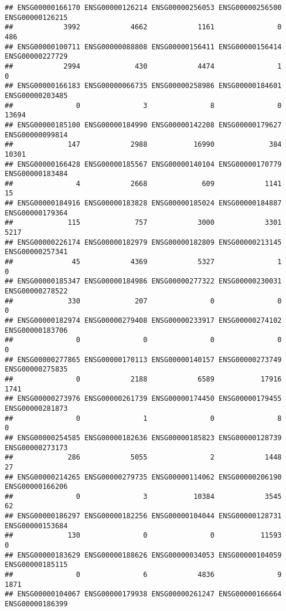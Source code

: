 \documentclass[
]{article}
\begin{document}
\begin{verbatim}
## ENSG00000166170 ENSG00000126214 ENSG00000256053 ENSG00000256500 ENSG00000126215 
##            3992            4662            1161               0             486 
## ENSG00000100711 ENSG00000088808 ENSG00000156411 ENSG00000156414 ENSG00000227729 
##            2994             430            4474               1               0 
## ENSG00000166183 ENSG00000066735 ENSG00000258986 ENSG00000184601 ENSG00000203485 
##               0               3               8               0           13694 
## ENSG00000185100 ENSG00000184990 ENSG00000142208 ENSG00000179627 ENSG00000099814 
##             147            2988           16990             384           10301 
## ENSG00000166428 ENSG00000185567 ENSG00000140104 ENSG00000170779 ENSG00000183484 
##               4            2668             609            1141              15 
## ENSG00000184916 ENSG00000183828 ENSG00000185024 ENSG00000184887 ENSG00000179364 
##             115             757            3000            3301            5217 
## ENSG00000226174 ENSG00000182979 ENSG00000182809 ENSG00000213145 ENSG00000257341 
##              45            4369            5327               1               0 
## ENSG00000185347 ENSG00000184986 ENSG00000277322 ENSG00000230031 ENSG00000278522 
##             330             207               0               0               0 
## ENSG00000182974 ENSG00000279408 ENSG00000233917 ENSG00000274102 ENSG00000183706 
##               0               0               0               0               0 
## ENSG00000277865 ENSG00000170113 ENSG00000140157 ENSG00000273749 ENSG00000275835 
##               0            2188            6589           17916            1741 
## ENSG00000273976 ENSG00000261739 ENSG00000174450 ENSG00000179455 ENSG00000281873 
##               0               1               0               8               0 
## ENSG00000254585 ENSG00000182636 ENSG00000185823 ENSG00000128739 ENSG00000273173 
##             286            5055               2            1448              27 
## ENSG00000214265 ENSG00000279735 ENSG00000114062 ENSG00000206190 ENSG00000166206 
##               0               3           10384            3545              62 
## ENSG00000186297 ENSG00000182256 ENSG00000104044 ENSG00000128731 ENSG00000153684 
##             130               0               0           11593               0 
## ENSG00000183629 ENSG00000188626 ENSG00000034053 ENSG00000104059 ENSG00000185115 
##               0               6            4836               9            1871 
## ENSG00000104067 ENSG00000179938 ENSG00000261247 ENSG00000166664 ENSG00000186399 

\end{verbatim}
\end{document}
